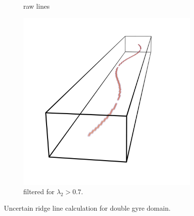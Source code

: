 \begin{figure}
\begin{subfigure}{0.33\textwidth}
        \caption{raw lines}
    \end{subfigure}
    \begin{subfigure}{0.33\textwidth}
        \includegraphics[trim=200 0 200 0, clip=true, width=\textwidth]{Images/RL3Dfilt.png}
        \caption{filtered for $\lambda_2 > 0.7$.}
    \end{subfigure}
    \caption{Uncertain ridge line calculation for double gyre domain.}
\end{figure}